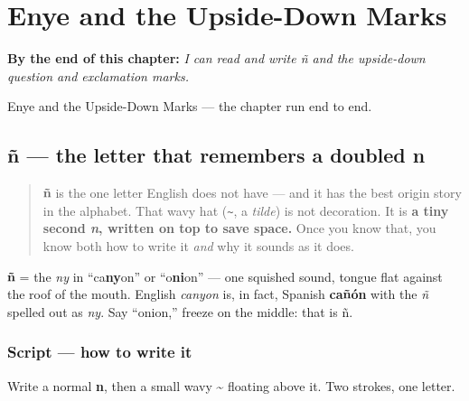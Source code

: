 
\chapter{Enye and the Upside-Down Marks}
\label{ch:enye-and-marks}

\begin{chapteropening}
\textbf{By the end of this chapter:} \emph{I can read and write ñ and the upside-down question and exclamation marks.}

Enye and the Upside-Down Marks — the chapter run end to end.
\end{chapteropening}

\section[ñ]{ñ — the letter that remembers a doubled n}

\label{lesson:ES-W02-enye}



\begin{quote}
\textbf{ñ} is the one letter English does not have — and it has the best origin story in the alphabet. That wavy hat (\texttt{\textasciitilde{}}, a \emph{tilde}) is not decoration. It is \textbf{a tiny second \emph{n}, written on top to save space.} Once you know that, you know both how to write it \emph{and} why it sounds as it does.
\end{quote}

\begin{sounds}
\textbf{ñ} = the \emph{ny} in \textquotedblleft{}ca\textbf{ny}on\textquotedblright{} or \textquotedblleft{}o\textbf{ni}on\textquotedblright{} — one squished sound, tongue flat against the roof of the mouth. English \emph{canyon} is, in fact, Spanish \textbf{cañón} with the \emph{ñ} spelled out as \emph{ny}. Say \textquotedblleft{}onion,\textquotedblright{} freeze on the middle: that is ñ.
\end{sounds}

\subsection*{Script — how to write it}
Write a normal \textbf{n}, then a small wavy \textbf{\textasciitilde{}} floating above it. Two strokes, one letter.

